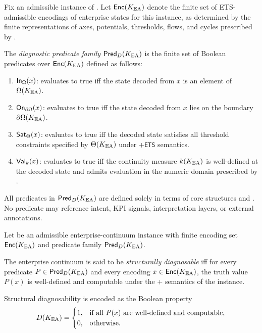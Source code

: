 \begin{definition}
Fix an admissible instance of \KEA{}. Let \(\mathsf{Enc}(K_{\mathrm{EA}})\) denote the
finite set of ETS-admissible encodings of enterprise states for this instance,
as determined by the finite representations of axes, potentials, thresholds,
flows, and cycles prescribed by \ETSK.

The \emph{diagnostic predicate family} \(\mathsf{Pred}_D(K_{\mathrm{EA}})\) is the finite
set of Boolean predicates over \(\mathsf{Enc}(K_{\mathrm{EA}})\) defined as follows:

\begin{enumerate}
\item \(\mathsf{In}_{\Omega}(x)\): evaluates to true iff the state decoded from
\(x\) is an element of \(\Omega(K_{\mathrm{EA}})\).

\item \(\mathsf{On}_{\partial \Omega}(x)\): evaluates to true iff the state decoded from
\(x\) lies on the boundary \(\partial \Omega(K_{\mathrm{EA}})\).

\item \(\mathsf{Sat}_{\Theta}(x)\): evaluates to true iff the decoded state
satisfies all threshold constraints specified by \(\Theta(K_{\mathrm{EA}})\) under
\OC{}+\texttt{ETS} semantics.

\item \(\mathsf{Val}_{k}(x)\): evaluates to true iff the continuity measure
\(k(K_{\mathrm{EA}})\) is well-defined at the decoded state and admits evaluation in
the numeric domain prescribed by \ETSK.
\end{enumerate}

All predicates in \(\mathsf{Pred}_D(K_{\mathrm{EA}})\) are defined solely in terms of
\OC{} core structures and \ETSK. No predicate may reference intent, KPI signals,
interpretation layers, or external annotations.
\end{definition}

\begin{definition}
Let \KEA{} be an admissible enterprise-continuum instance with finite encoding
set \(\mathsf{Enc}(K_{\mathrm{EA}})\) and predicate family \(\mathsf{Pred}_D(K_{\mathrm{EA}})\).

The enterprise continuum \KEA{} is said to be \emph{structurally diagnosable} iff
for every predicate \(P \in \mathsf{Pred}_D(K_{\mathrm{EA}})\) and every encoding
\(x \in \mathsf{Enc}(K_{\mathrm{EA}})\), the truth value \(P(x)\) is well-defined and
computable under the \OC{}+\ETSK{} semantics of the instance.

Structural diagnosability is encoded as the Boolean property
\[
D(K_{\mathrm{EA}}) =
\begin{cases}
1, & \text{if all } P(x) \text{ are well-defined and computable},\\
0, & \text{otherwise.}
\end{cases}
\]
\end{definition}

